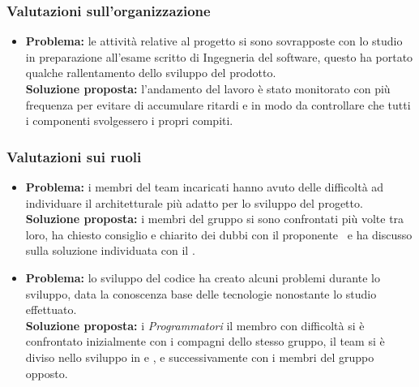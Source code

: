 \subsubsection{Valutazioni sull'organizzazione}
\begin{itemize}
	\item \textbf{Problema:} le attività relative al progetto si sono sovrapposte con lo studio in preparazione all'esame scritto di Ingegneria del software, questo ha portato qualche rallentamento dello sviluppo del prodotto.\\
	\textbf{Soluzione proposta:} l'andamento del lavoro è stato monitorato con più frequenza per evitare di accumulare ritardi e in modo da controllare che tutti i componenti svolgessero i propri compiti.
\end{itemize}
\subsubsection{Valutazioni sui ruoli}
\begin{itemize}
	\item \textbf{Problema:} i membri del team incaricati hanno avuto delle difficoltà ad individuare il  architetturale più adatto per lo sviluppo del progetto.\\
	\textbf{Soluzione proposta:} i membri del gruppo si sono confrontati più volte tra loro, ha chiesto consiglio e chiarito dei dubbi con il proponente \Proponente\ e ha discusso sulla soluzione individuata con il \CR{}.
\end{itemize}
\begin{itemize}
	\item \textbf{Problema:} lo sviluppo del codice ha creato alcuni problemi durante lo sviluppo, data la conoscenza base delle tecnologie nonostante lo studio effettuato.\\
	\textbf{Soluzione proposta:} i \textit{Programmatori} il membro con difficoltà si è confrontato inizialmente con i compagni dello stesso gruppo, il team si è diviso nello sviluppo in  e , e successivamente con i membri del gruppo opposto.
\end{itemize}